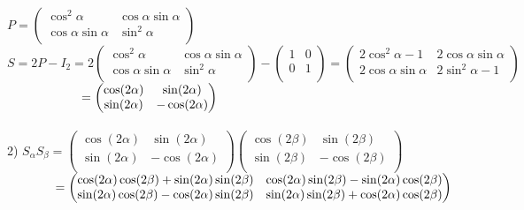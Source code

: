 \documentclass{article}
\newcommand\tab[1][1cm]{\hspace*{#1}}
\begin{document}
\\
$P = \begin{pmatrix}
    \cos^2 \alpha & \cos \alpha \sin \alpha\\
    \cos \alpha \sin \alpha & \sin^2 \alpha\\
\end{pmatrix}$ \vspace{3mm} \\
$S = 2P - I_2 = 2\begin{pmatrix}
    \cos^2 \alpha & \cos \alpha \sin \alpha\\
    \cos \alpha \sin \alpha & \sin^2 \alpha\\
\end{pmatrix} - \begin{pmatrix}
    1 & 0\\
    0 & 1\\
\end{pmatrix} = \begin{pmatrix}
    2 \cos^2 \alpha - 1 & 2 \cos \alpha \sin \alpha\\
    2 \cos \alpha \sin \alpha & 2 \sin^2 \alpha - 1\\
\end{pmatrix}$\\
$\tab[2.1cm]= \begin{pmatrix}
    \cos(2 \alpha) & \sin(2 \alpha)\\
    \sin(2 \alpha) & -\cos(2 \alpha)\\
\end{pmatrix}$\\
\\
2) $S_\alpha S_\beta = \begin{pmatrix}
    \cos(2 \alpha) & \sin(2 \alpha)\\
    \sin(2 \alpha) & -\cos(2 \alpha)\\
\end{pmatrix} \begin{pmatrix}
    \cos(2 \beta) & \sin(2 \beta)\\
    \sin(2 \beta) & -\cos(2 \beta)\\
\end{pmatrix} $\\
$\tab[1.35cm] = \begin{pmatrix}
    \cos(2 \alpha) \cos(2 \beta) + \sin(2 \alpha) \sin(2 \beta) & \cos(2 \alpha) \sin(2 \beta) - \sin(2 \alpha) \cos(2 \beta)\\
    \sin(2 \alpha) \cos(2 \beta) - \cos(2 \alpha) \sin(2 \beta) & \sin(2 \alpha) \sin(2 \beta) + \cos(2 \alpha) \cos(2 \beta) \\
\end{pmatrix}$\\
\end{document}
